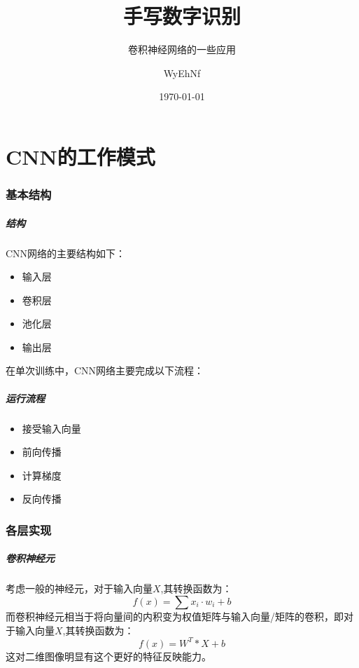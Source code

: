 \documentclass[
aspectratio=169,  %
]{ctexbeamer}
\institute[SJTU]{上海交通大学 2025级ACM班} %
\title{手写数字识别}         %
\subtitle{卷积神经网络的一些应用}       %
\author{WyEhNf}                       %
\date{\today}                        %
\begin{document}
	
	\maketitle                           %
	
	\part{CNN的工作模式}
	
	\AtBeginSection[]{
		\begin{frame}
			\sectionpage                        %
		\end{frame}
	}
	
	\section{基本结构}
	
	\begin{frame}
		\frametitle{结构}
		CNN网络的主要结构如下：
		\begin{itemize}
			\item 输入层
			\item 卷积层
			\item 池化层
			\item 输出层 
		\end{itemize}
	\end{frame}
	
	\begin{frame}
		在单次训练中，CNN网络主要完成以下流程：
		\frametitle{运行流程}
		\begin{itemize}
		\item 接受输入向量
		\item 前向传播
		\item 计算梯度
		\item 反向传播
		\end{itemize}
	\end{frame}

	
	\section{各层实现}
	
	\begin{frame}
		\frametitle{卷积神经元}
		考虑一般的神经元，对于输入向量$X$,其转换函数为：
		$$
		f(x)=\sum{x_i·w_i}+b
		$$
		而卷积神经元相当于将向量间的内积变为权值矩阵与输入向量/矩阵的卷积，即对于输入向量$X$,其转换函数为：
		$$
		f(x)=W^T*X+b
		$$
		这对二维图像明显有这个更好的特征反映能力。
	\end{frame}
	
\end{document}
